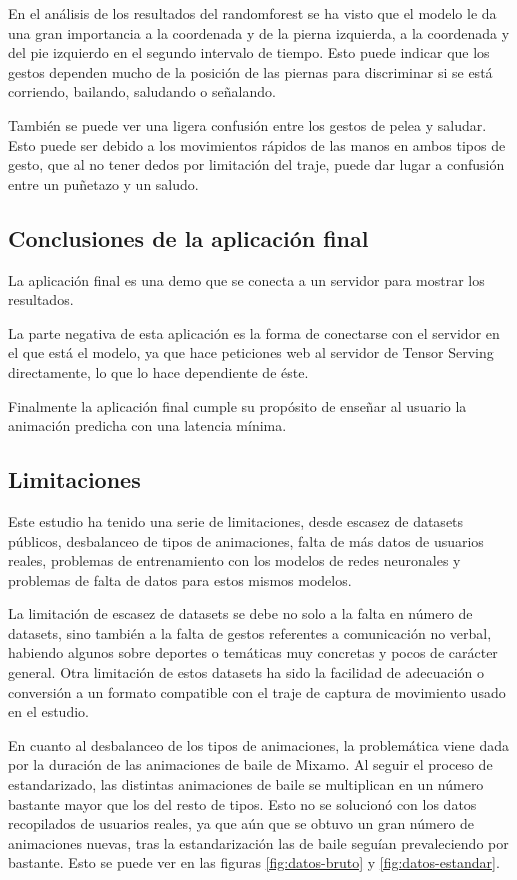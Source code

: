 En el análisis de los resultados del \gls{randomforest} se ha visto que el modelo le da una gran importancia a la coordenada y de la pierna izquierda, a la coordenada y del pie izquierdo en el segundo intervalo de tiempo. Esto puede indicar que los gestos dependen mucho de la posición de las piernas para discriminar si se está corriendo, bailando, saludando o señalando.

También se puede ver una ligera confusión entre los gestos de pelea y saludar. Esto puede ser debido a los movimientos rápidos de las manos en ambos tipos de gesto, que al no tener dedos por limitación del traje, puede dar lugar a confusión entre un puñetazo y un saludo.

\subsection{Conclusiones de la aplicación final}
La aplicación final es una demo que se conecta a un servidor para mostrar los resultados.

La parte negativa de esta aplicación es la forma de conectarse con el servidor en el que está el modelo, ya que hace peticiones web al servidor de Tensor Serving directamente, lo que lo hace dependiente de éste.

Finalmente la aplicación final cumple su propósito de enseñar al usuario la animación predicha con una latencia mínima.


\subsection{Limitaciones}

Este estudio ha tenido una serie de limitaciones, desde escasez de datasets públicos, desbalanceo de tipos de animaciones, falta de más datos de usuarios reales, problemas de entrenamiento con los modelos de redes neuronales y problemas de falta de datos para estos mismos modelos.

La limitación de escasez de datasets se debe no solo a la falta en número de datasets, sino también a la falta de gestos referentes a comunicación no verbal, habiendo algunos sobre deportes o temáticas muy concretas y pocos de carácter general.  Otra limitación de estos datasets ha sido la facilidad de adecuación o conversión a un formato compatible con el traje de captura de movimiento usado en el estudio.

En cuanto al desbalanceo de los tipos de animaciones, la problemática viene dada por la duración de las animaciones de baile de Mixamo. Al seguir el proceso de estandarizado, las distintas animaciones de baile se multiplican en un número bastante mayor que los del resto de tipos. Esto no se solucionó con los datos recopilados de usuarios reales, ya que aún que se obtuvo un gran número de animaciones nuevas, tras la estandarización las de baile seguían prevaleciendo por bastante. Esto se puede ver en las figuras \ref{fig:datos-bruto} y \ref{fig:datos-estandar}.

